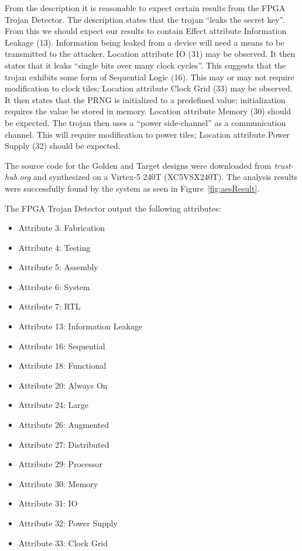 \documentclass[journal, hidelinks]{IEEEtran}
\begin{document}
From the description it is reasonable to expect certain results from the FPGA Trojan Detector.
The description states that the trojan ``leaks the secret key''.
From this we should expect our results to contain Effect attribute Information Leakage (13).
Information being leaked from a device will need a means to be transmitted to the attacker.
Location attribute IO (31) may be observed.
It then states that it leaks ``single bits over many clock cycles''. 
This suggests that the trojan exhibits some form of Sequential Logic (16).
This may or may not require modification to clock tiles; Location attribute Clock Grid (33) may be observed. 
It then states that the PRNG is initialized to a predefined value; initialization requires the value be stored in memory. 
Location attribute Memory (30) should be expected.
The trojan then uses a ``power side-channel'' as a communication channel.
This will require modification to power tiles; Location attribute Power Supply (32) should be expected.

The source code for the Golden and Target designs were downloaded from \textit{trust-hub.org} and synthesized on a Virtex-5 240T  (XC5VSX240T).
The analysis results were successfully found by the system as seen in Figure~\ref{fig:aesResult}.


The FPGA Trojan Detector output the following attributes:
\begin{itemize}
	\item Attribute 3: Fabrication
	\item Attribute 4: Testing
	\item Attribute 5: Assembly
	\item Attribute 6: System
	\item Attribute 7: RTL
	\item Attribute 13: Information Leakage
	\item Attribute 16: Sequential
	\item Attribute 18: Functional
	\item Attribute 20: Always On
	\item Attribute 24: Large
	\item Attribute 26: Augmented
	\item Attribute 27: Distributed
	\item Attribute 29: Processor
	\item Attribute 30: Memory
	\item Attribute 31: IO
	\item Attribute 32: Power Supply
	\item Attribute 33: Clock Grid
\end{itemize}
\end{document}
